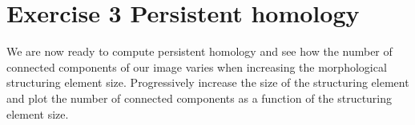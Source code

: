 \documentclass[a4paper, 11pt, french]{article}
\begin{document}
\section*{Exercise 3 \rm Persistent homology}

We are now ready to compute persistent homology and see how the number of connected components of our image varies when increasing the morphological structuring element size.
Progressively increase the size of the structuring element and plot the number of connected components as a function of the structuring element size.	
\end{document}

